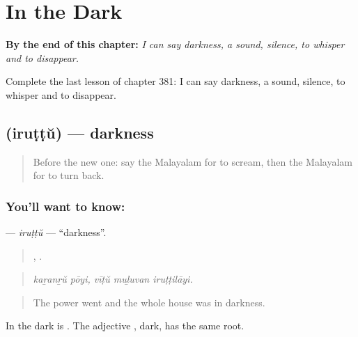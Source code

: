 
\chapter{In the Dark}
\label{ch:ml-in-the-dark}

\begin{chapteropening}
\textbf{By the end of this chapter:} \emph{I can say darkness, a sound, silence, to whisper and to disappear.}

Complete the last lesson of chapter 381: I can say darkness, a sound, silence, to whisper and to disappear.
\end{chapteropening}

\section[\texorpdfstring{\ml{ഇരുട്ട്} (iruṭṭŭ)}{ഇരുട്ട് (iruṭṭŭ)}]{ (iruṭṭŭ) — darkness}

\label{lesson:ML-C381-iruttu}



\begin{quote}
Before the new one: say the Malayalam for to scream, then the Malayalam for to turn back.
\end{quote}

\subsection*{You'll want to know: }
\textbf{} — \emph{iruṭṭŭ} — \textquotedblleft{}darkness\textquotedblright{}.

\begin{quote}
 ,   .
\end{quote}

\begin{quote}
\emph{kaṟanṟŭ pōyi, vīṭŭ muḻuvan iruṭṭilāyi.}
\end{quote}

\begin{quote}
The power went and the whole house was in darkness.
\end{quote}

In the dark is . The adjective , dark, has the same root.

